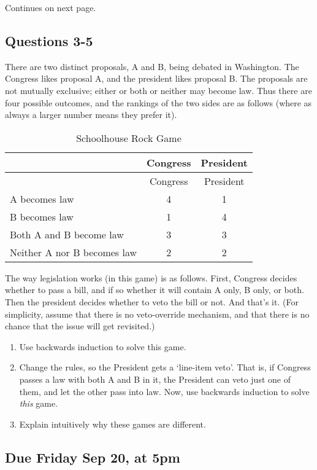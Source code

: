 \documentclass[11pt,]{article}
\providecommand{\tightlist}{%
  \setlength{\itemsep}{0pt}\setlength{\parskip}{0pt}}
\begin{document}
Continues on next page.

\newpage

\hypertarget{questions-3-5}{%
\subsection{Questions 3-5}\label{questions-3-5}}

There are two distinct proposals, A and B, being debated in Washington.
The Congress likes proposal A, and the president likes proposal B. The
proposals are not mutually exclusive; either or both or neither may
become law. Thus there are four possible outcomes, and the rankings of
the two sides are as follows (where as always a larger number means they
prefer it).

\begin{longtable}[]{@{}lcc@{}}
\caption{Schoolhouse Rock Game}\tabularnewline
\toprule
& Congress & President\tabularnewline
\midrule
\endfirsthead
\toprule
& Congress & President\tabularnewline
\midrule
\endhead
A becomes law & 4 & 1\tabularnewline
B becomes law & 1 & 4\tabularnewline
Both A and B become law & 3 & 3\tabularnewline
Neither A nor B becomes law & 2 & 2\tabularnewline
\bottomrule
\end{longtable}

The way legislation works (in this game) is as follows. First, Congress
decides whether to pass a bill, and if so whether it will contain A
only, B only, or both. Then the president decides whether to veto the
bill or not. And that's it. (For simplicity, assume that there is no
veto-override mechanism, and that there is no chance that the issue will
get revisited.)

\begin{enumerate}
\def\labelenumi{\arabic{enumi}.}
\setcounter{enumi}{2}
\tightlist
\item
  Use backwards induction to solve this game.
\item
  Change the rules, so the President gets a `line-item veto'. That is,
  if Congress passes a law with both A and B in it, the President can
  veto just one of them, and let the other pass into law. Now, use
  backwards induction to solve \emph{this} game.
\item
  Explain intuitively why these games are different.
\end{enumerate}

\hypertarget{due-friday-sep-20-at-5pm}{%
\subsection{Due Friday Sep 20, at 5pm}\label{due-friday-sep-20-at-5pm}}
\end{document}
